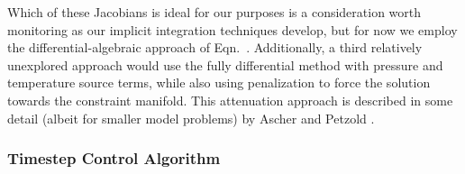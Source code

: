 Which of these Jacobians is ideal for our purposes is a consideration worth
monitoring as our implicit integration techniques develop, but for now we
employ the differential-algebraic approach of Eqn.~. Additionally, 
a third relatively unexplored approach would use the fully differential
method with pressure and temperature source terms, while also using penalization
to force the solution towards the constraint manifold. This attenuation approach
is described in some detail (albeit for smaller model problems) by Ascher and
Petzold \cite{ascher1998computer}.

\subsubsection{Timestep Control Algorithm}


